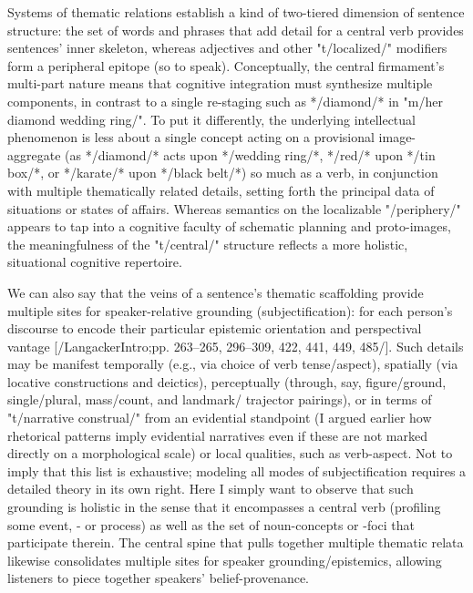 Systems of thematic relations establish a kind of two-tiered 
dimension of sentence structure: the set of words and phrases that 
add detail for a central verb provides sentences' inner skeleton, 
whereas adjectives and other "t/localized/" modifiers form 
a peripheral epitope (so to speak).  Conceptually, the 
central firmament's multi-part nature means that cognitive 
integration must synthesize multiple components, in contrast to a 
single re-staging such as */diamond/* in "m/her diamond wedding ring/".  
To put it differently, the underlying intellectual phenomenon 
is less about a single concept acting on a provisional image-aggregate 
(as */diamond/* acts upon */wedding ring/*, 
*/red/* upon */tin box/*, or */karate/* upon */black belt/*) so much as a verb, in conjunction with 
multiple thematically related details, setting forth the principal 
data of situations or states of affairs.  Whereas semantics 
on the localizable "/periphery/" appears to tap into a 
cognitive faculty of schematic planning and proto-images, 
the meaningfulness of the "t/central/" structure reflects a 
more holistic, situational cognitive repertoire. 

We can also say that the veins of a sentence's thematic scaffolding 
provide multiple sites for speaker-relative grounding 
(subjectification): for 
each person's discourse to encode their particular epistemic 
orientation and perspectival vantage [/LangackerIntro;pp. 263--265, 296--309, 422, 
441, 449, 485/].  Such details may 
be manifest temporally (e.g., via choice of verb tense/aspect), 
spatially (via locative constructions and deictics), perceptually 
(through, say, figure/ground, single/plural, 
mass/count, and landmark/ trajector pairings), 
or in terms of "t/narrative construal/" from an evidential 
standpoint (I argued earlier how rhetorical patterns 
imply evidential narratives even if these are not marked 
directly on a morphological scale) or local qualities, such as 
verb-aspect.  Not to imply that this list is exhaustive;   
modeling all modes of subjectification requires a detailed 
theory in its own right.  Here I simply want to observe that 
such grounding is holistic in the sense that it encompasses 
a central verb (profiling some event, -%
or process) as well as 
the set of noun-concepts or -foci that participate therein.  
The central spine that pulls together multiple thematic 
relata likewise consolidates multiple sites for speaker 
grounding/epistemics, allowing listeners to piece together 
speakers' belief-provenance.


